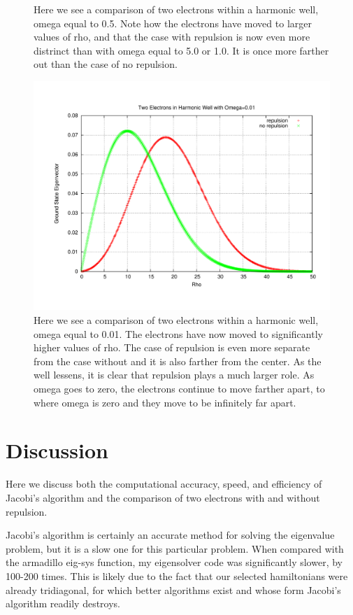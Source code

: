 \documentclass[11pt,a4paper]{article}
\begin{document}
{\begin{figure}
\caption{Here we see a comparison of two electrons within a harmonic well, omega equal to 0.5. Note how the electrons have moved to larger values of rho, and that the case with repulsion is now even more distrinct than with omega equal to 5.0 or 1.0. It is once more farther out than the case of no repulsion.}
\end{figure}
\begin{figure}
\centering
\includegraphics[width=1.0\textwidth]{2e_001.pdf}
\caption{Here we see a comparison of two electrons within a harmonic well, omega equal to 0.01. The electrons have now moved to significantly higher values of rho. The case of repulsion is even more separate from the case without and it is also farther from the center. As the well lessens, it is clear that repulsion plays a much larger role. As omega goes to zero, the electrons continue to move farther apart, to where omega is zero and they move to be infinitely far apart.}
\end{figure}
\section{Discussion}

Here we discuss both the computational accuracy, speed, and efficiency of Jacobi's algorithm and the comparison of two electrons with and without repulsion.

Jacobi's algorithm is certainly an accurate method for solving the eigenvalue problem, but it is a slow one for this particular problem. When compared with the armadillo eig-sys function, my eigensolver code was significantly slower, by 100-200 times. This is likely due to the fact that our selected hamiltonians were already tridiagonal, for which better algorithms exist and whose form Jacobi's algorithm readily destroys. 

}
\end{document}
